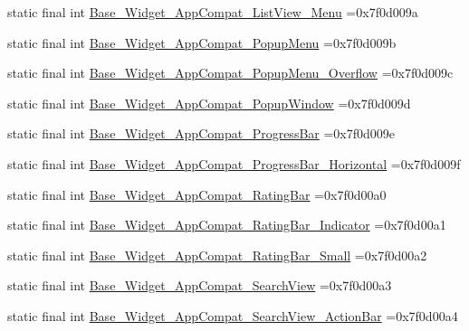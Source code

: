 \begin{DoxyCompactItemize}
\item 
static final int \mbox{\hyperlink{classbr_1_1unb_1_1cic_1_1mp_1_1marketmaster_1_1R_1_1style_a1171ea2afe73039b379d20d936853c8e}{Base\+\_\+\+Widget\+\_\+\+App\+Compat\+\_\+\+List\+View\+\_\+\+Menu}} =0x7f0d009a
\item 
static final int \mbox{\hyperlink{classbr_1_1unb_1_1cic_1_1mp_1_1marketmaster_1_1R_1_1style_a0bf6ee947123858f7e2ea7fade28ea94}{Base\+\_\+\+Widget\+\_\+\+App\+Compat\+\_\+\+Popup\+Menu}} =0x7f0d009b
\item 
static final int \mbox{\hyperlink{classbr_1_1unb_1_1cic_1_1mp_1_1marketmaster_1_1R_1_1style_a3708b800a334ef304f8d0376c3bcd076}{Base\+\_\+\+Widget\+\_\+\+App\+Compat\+\_\+\+Popup\+Menu\+\_\+\+Overflow}} =0x7f0d009c
\item 
static final int \mbox{\hyperlink{classbr_1_1unb_1_1cic_1_1mp_1_1marketmaster_1_1R_1_1style_a4dea9a88258d1ecc28231b0225d3bc68}{Base\+\_\+\+Widget\+\_\+\+App\+Compat\+\_\+\+Popup\+Window}} =0x7f0d009d
\item 
static final int \mbox{\hyperlink{classbr_1_1unb_1_1cic_1_1mp_1_1marketmaster_1_1R_1_1style_a687eda6903391b54cfdab0a837781413}{Base\+\_\+\+Widget\+\_\+\+App\+Compat\+\_\+\+Progress\+Bar}} =0x7f0d009e
\item 
static final int \mbox{\hyperlink{classbr_1_1unb_1_1cic_1_1mp_1_1marketmaster_1_1R_1_1style_ac1347ffc7e977c25e5b54b100ad5d538}{Base\+\_\+\+Widget\+\_\+\+App\+Compat\+\_\+\+Progress\+Bar\+\_\+\+Horizontal}} =0x7f0d009f
\item 
static final int \mbox{\hyperlink{classbr_1_1unb_1_1cic_1_1mp_1_1marketmaster_1_1R_1_1style_a4b05e0ba15c0ef28d178a4692359b76e}{Base\+\_\+\+Widget\+\_\+\+App\+Compat\+\_\+\+Rating\+Bar}} =0x7f0d00a0
\item 
static final int \mbox{\hyperlink{classbr_1_1unb_1_1cic_1_1mp_1_1marketmaster_1_1R_1_1style_af6613d0117108313991f1e1482ab94d8}{Base\+\_\+\+Widget\+\_\+\+App\+Compat\+\_\+\+Rating\+Bar\+\_\+\+Indicator}} =0x7f0d00a1
\item 
static final int \mbox{\hyperlink{classbr_1_1unb_1_1cic_1_1mp_1_1marketmaster_1_1R_1_1style_a39da19e5dccd23879270eed865acd945}{Base\+\_\+\+Widget\+\_\+\+App\+Compat\+\_\+\+Rating\+Bar\+\_\+\+Small}} =0x7f0d00a2
\item 
static final int \mbox{\hyperlink{classbr_1_1unb_1_1cic_1_1mp_1_1marketmaster_1_1R_1_1style_adb8921d55fd28d9ed3f6571b790f7244}{Base\+\_\+\+Widget\+\_\+\+App\+Compat\+\_\+\+Search\+View}} =0x7f0d00a3
\item 
static final int \mbox{\hyperlink{classbr_1_1unb_1_1cic_1_1mp_1_1marketmaster_1_1R_1_1style_a8bf959d9e1ed4a3a9d1f031df3802dc4}{Base\+\_\+\+Widget\+\_\+\+App\+Compat\+\_\+\+Search\+View\+\_\+\+Action\+Bar}} =0x7f0d00a4

\end{DoxyCompactItemize}
